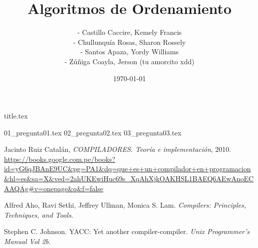 \documentclass[a4paper,12pt]{article}
\title{Algoritmos de Ordenamiento}
\author{- Castillo Caccire, Kemely Francis\\
        - Chullunquía Rosas, Sharon Rossely\\
        - Santos Apaza, Yordy Williams\\
        - Zúñiga Coayla, Jerson (tu amorcito xdd)}
\date{\today}
\begin{document}
{title.tex}


{01_pregunta01.tex}
{02_pregunta02.tex}
{03_pregunta03.tex}


\newpage
\begin{thebibliography}{8}

Jacinto Ruiz Catalán, \textit{COMPILADORES. Teoría e implementación}, 2010.
\url{https://books.google.com.pe/books?id=yG6qJBAnE9UC&pg=PA1&dq=que+es+un+compilador+en+programacion&hl=es&sa=X&ved=2ahUKEwiHuc69s_XqAhXjkOAKHSL1BAEQ6AEwAnoECAAQAg#v=onepage&q&f=false} 

Alfred Aho, Ravi Sethi, Jeffrey Ullman, Monica S. Lam. \textit{Compilers: Principles, Techniques, and Tools}.

Stephen C. Johnson. YACC: Yet another compiler-compiler. \textit{Unix Programmer's Manual Vol 2b}.


\end{thebibliography}
\end{document}
